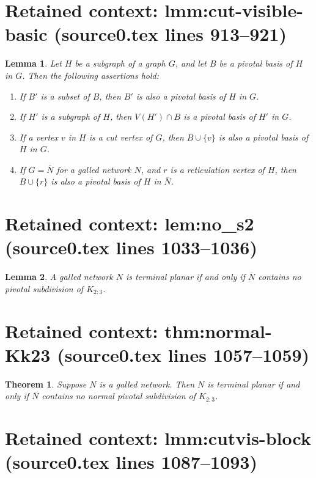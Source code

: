 \documentclass[10pt,a4paper]{amsart}
\theoremstyle{plain}
\theoremstyle{thmstyleone}
\newtheorem{theorem}{Theorem}
\theoremstyle{thmstyletwo}
\newtheorem{lemma}{Lemma}
\theoremstyle{thmstylethree}
\begin{document}
\section*{Retained context: lmm:cut-visible-basic (source0.tex lines 913--921)}

\begin{lemma}\label{lmm:cut-visible-basic}
Let $H$ be a subgraph of a graph $G$, and let $B$ be a pivotal basis of $H$ in $G$. Then the following assertions hold:
\begin{enumerate}
\item[(i)] If $B'$ is a subset of $B$, then  $B'$ is also a pivotal basis of $H$ in $G$.
\item[(ii)] If $H'$ is a subgraph of $H$, then $V(H')\cap B$ is a pivotal basis of  $H'$ in $G$.
\item[(iii)] If a vertex $v$ in $H$ is a cut vertex of $G$,   then $B \cup \{v\}$ is also a pivotal basis of $H$ in $G$. 
\item[(iv)] If $G=\overline{N}$ for a galled network $N$, and $r$ is a reticulation vertex of $H$, then $B\cup\{r\}$ is also a pivotal basis of $H$ in $\overline{N}$.
\end{enumerate}
\end{lemma}


\section*{Retained context: lem:no\_s2 (source0.tex lines 1033--1036)}

\begin{lemma}\label{lem:no_s2}
A galled network $N$ is terminal planar if and only if $\overline{N}$ contains no pivotal subdivision of ${K}_{2:3}$.

\end{lemma}


\section*{Retained context: thm:normal-Kk23 (source0.tex lines 1057--1059)}

\begin{theorem}\label{thm:normal-Kk23}
Suppose $N$ is a galled network. Then $N$ is terminal planar if and only if $\overline{N}$ contains no normal pivotal subdivision of $K_{2:3}$.
\end{theorem}


\section*{Retained context: lmm:cutvis-block (source0.tex lines 1087--1093)}
\end{document}

